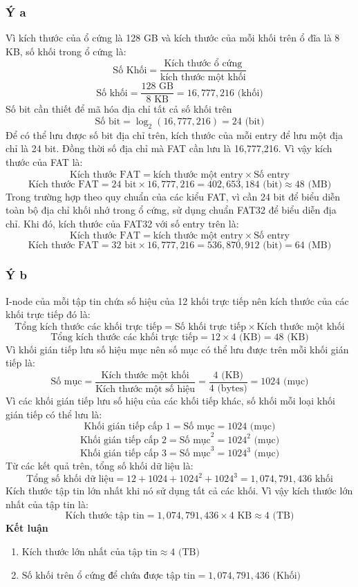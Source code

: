 \documentclass[12pt, letterpaper]{article}
\begin{document}
\subsubsection{Ý a}
Vì kích thước của ổ cứng là 128 GB và kích thước của mỗi khối trên ổ đĩa là 8 KB, số khối trong ổ cứng là:
$$ \text{Số Khối} = \frac{\text{Kích thước ổ cứng}}{\text{kích thước một khối}} $$
$$ \text{Số khối} = \frac{128 \text{ GB}}{8 \text{ KB}} = 16,777,216 \text{ (khối)} $$
Số bit cần thiết để mã hóa địa chỉ tất cả số khối trên
$$ \text{Số bit} = \log_2 (16,777,216) = 24 \text{ (bit)} $$
Để có thể lưu được số bit địa chỉ trên, kích thước của mỗi entry để lưu một địa chỉ là 24 bit. 
Đồng thời số địa chỉ mà FAT cần lưu là 16,777,216. Vì vậy kích thước của FAT là:
$$ \text{Kích thước FAT} = \text{kích thước một entry} \times \text{Số entry} $$
$$ \text{Kích thước FAT} = 24 \text{ bit} \times 16,777,216 = 402,653,184 \text{ (bit)} \approx 48 \text{ (MB)} $$
Trong trường hợp theo quy chuẩn của các kiểu FAT, vì cần 24 bit để biểu diễn toàn bộ địa chỉ khối nhớ trong ổ cứng,
sử dụng chuẩn FAT32 để biểu diễn địa chỉ. Khi đó, kích thước của FAT32 với số entry trên là:
$$ \text{Kích thước FAT} = \text{kích thước một entry} \times \text{Số entry} $$
$$ \text{Kích thước FAT} = 32 \text{ bit} \times 16,777,216 = 536,870,912 \text{ (bit)} = 64 \text{ (MB)} $$
\subsubsection{Ý b}
I-node của mỗi tập tin chứa số hiệu của 12 khối trực tiếp nên kích thước của các khối trực tiếp đó là:
$$ \text{Tổng kích thước các khối trực tiếp} = \text{Số khối trực tiếp} \times \text{Kích thước một khối} $$
$$ \text{Tổng kích thước các khối trực tiếp} = 12 \times 4 \text{ (KB)} = 48 \text{ (KB)} $$
Vì khối gián tiếp lưu số hiệu mục nên số mục có thể lưu được trên mỗi khối gián tiếp là:
$$ \text{Số mục} = \frac{\text{Kích thước một khối}}{\text{Kích thước một số hiệu}} = \frac{4 \text{ (KB)}}{4 \text{ (bytes)}} = 1024 \text{ (mục)} $$
Vì các khối gián tiếp lưu số hiệu của các khối tiếp khác, số khối mỗi loại khối gián tiếp có thể lưu là:
$$ \text{Khối gián tiếp cấp 1} = \text{Số mục} = 1024 \text{ (mục)} $$
$$ \text{Khối gián tiếp cấp 2} = \text{Số mục}^2 = 1024^2 \text{ (mục)} $$
$$ \text{Khối gián tiếp cấp 3} = \text{Số mục}^3 = 1024^3 \text{ (mục)} $$
Từ các kết quả trên, tổng số khối dữ liệu là:
$$\text{Tổng số khối dữ liệu} = 12 + 1024 + 1024^2 + 1024^3 = 1,074,791,436 \text{ khối}$$
Kích thước tập tin lớn nhất khi nó sử dụng tất cả các khối. Vì vậy kích thước lớn nhất của tập tin là:
$$\text{Kích thước tập tin} = 1,074,791,436 \times 4 \text{ KB} \approx 4 \text{ (TB)}$$
\textbf{Kết luận}
\begin{enumerate}[label=\roman*)]
    \item $ \text{Kích thước lớn nhất của tập tin} \approx 4 \text{ (TB)} $
    \item $ \text{Số khối trên ổ cứng để chứa được tập tin} = 1,074,791,436 \text{ (Khối)} $
\end{enumerate}
\end{document}
